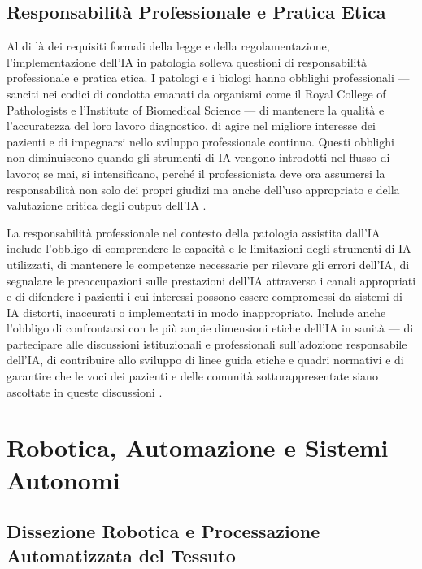 \subsection{Responsabilità Professionale e Pratica Etica}

Al di là dei requisiti formali della legge e della regolamentazione, l'implementazione dell'IA in patologia solleva questioni di responsabilità professionale e pratica etica. I patologi e i biologi hanno obblighi professionali — sanciti nei codici di condotta emanati da organismi come il Royal College of Pathologists e l'Institute of Biomedical Science — di mantenere la qualità e l'accuratezza del loro lavoro diagnostico, di agire nel migliore interesse dei pazienti e di impegnarsi nello sviluppo professionale continuo. Questi obblighi non diminuiscono quando gli strumenti di IA vengono introdotti nel flusso di lavoro; se mai, si intensificano, perché il professionista deve ora assumersi la responsabilità non solo dei propri giudizi ma anche dell'uso appropriato e della valutazione critica degli output dell'IA \cite{hanna2024}.

La responsabilità professionale nel contesto della patologia assistita dall'IA include l'obbligo di comprendere le capacità e le limitazioni degli strumenti di IA utilizzati, di mantenere le competenze necessarie per rilevare gli errori dell'IA, di segnalare le preoccupazioni sulle prestazioni dell'IA attraverso i canali appropriati e di difendere i pazienti i cui interessi possono essere compromessi da sistemi di IA distorti, inaccurati o implementati in modo inappropriato. Include anche l'obbligo di confrontarsi con le più ampie dimensioni etiche dell'IA in sanità — di partecipare alle discussioni istituzionali e professionali sull'adozione responsabile dell'IA, di contribuire allo sviluppo di linee guida etiche e quadri normativi e di garantire che le voci dei pazienti e delle comunità sottorappresentate siano ascoltate in queste discussioni \cite{elendu2023}.

\section{Robotica, Automazione e Sistemi Autonomi}
\label{sec:ch5_robotics}

\subsection{Dissezione Robotica e Processazione Automatizzata del Tessuto}


